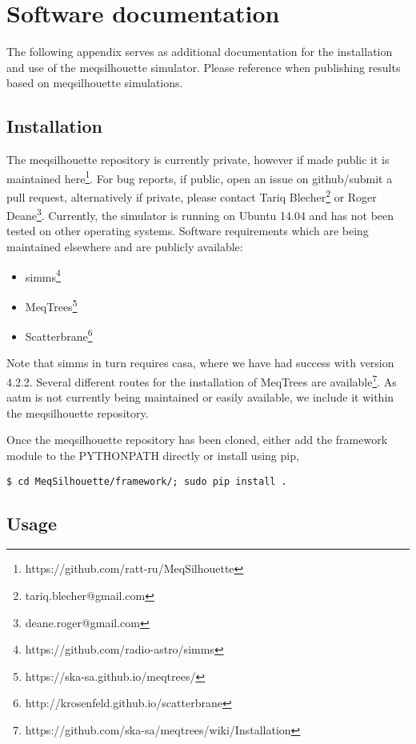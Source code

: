 \chapter{Software documentation}
The following appendix serves as additional documentation for the installation and use of the {\sc meqsilhouette} simulator. Please reference \citep{Blecher_2016} when publishing results based on {\sc meqsilhouette} simulations.

\section{Installation}

The {\sc meqsilhouette} repository is currently private, however if made public it is maintained here\footnote{https://github.com/ratt-ru/MeqSilhouette}. For bug reports, if public, open an issue on github/submit a pull request, alternatively if private, please contact Tariq Blecher\footnote{tariq.blecher@gmail.com} or Roger Deane\footnote{deane.roger@gmail.com}. Currently, the simulator is running on {\sc Ubuntu 14.04} and has not been tested on other operating systems. Software requirements which are being maintained elsewhere and are publicly available: 
\begin{itemize}
 \item {\sc simms}\footnote{https://github.com/radio-astro/simms}
 \item {\sc MeqTrees}\footnote{https://ska-sa.github.io/meqtrees/} 
 \item {\sc Scatterbrane}\footnote{http://krosenfeld.github.io/scatterbrane}
\end{itemize}

Note that {\sc simms} in turn requires {\sc casa}, where we have had success with version 4.2.2. Several different routes for the installation of {\sc MeqTrees} are available\footnote{https://github.com/ska-sa/meqtrees/wiki/Installation}. As {\sc aatm} is not currently being maintained or easily available, we include it within the {\sc meqsilhouette} repository. 


Once the {\sc meqsilhouette} repository has been cloned, either add the framework module to the PYTHONPATH directly or install using pip,
\begin{verbatim}
$ cd MeqSilhouette/framework/; sudo pip install .
\end{verbatim}
\section{Usage}

